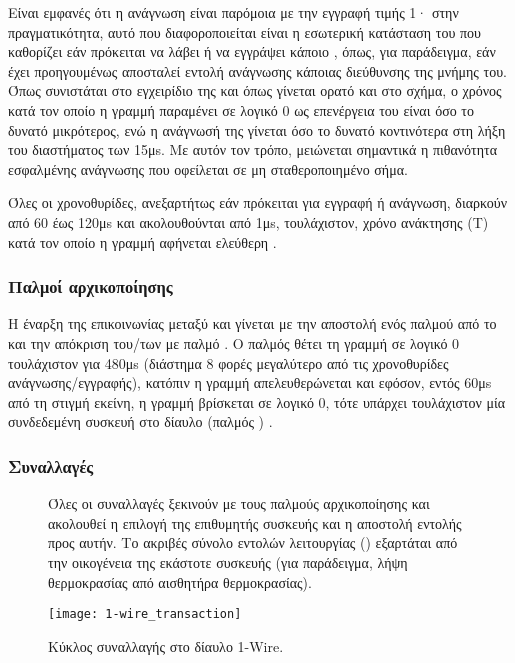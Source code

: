 Είναι εμφανές ότι η ανάγνωση είναι παρόμοια με την εγγραφή  τιμής 1·
στην πραγματικότητα, αυτό που διαφοροποιείται είναι η εσωτερική κατάσταση του
 που καθορίζει εάν πρόκειται να λάβει ή να εγγράψει κάποιο ,
όπως, για παράδειγμα, εάν έχει προηγουμένως αποσταλεί εντολή ανάγνωσης κάποιας
διεύθυνσης της μνήμης του.
Όπως συνιστάται στο εγχειρίδιο της \textcite[17]{ds18b20} και όπως γίνεται ορατό
και στο σχήμα, ο χρόνος κατά τον οποίο η γραμμή παραμένει σε λογικό 0 ως
επενέργεια του  είναι όσο το δυνατό μικρότερος, ενώ η ανάγνωσή της
γίνεται όσο το δυνατό κοντινότερα στη λήξη του διαστήματος των 15μs. Με αυτόν
τον τρόπο, μειώνεται σημαντικά η πιθανότητα εσφαλμένης ανάγνωσης που οφείλεται
σε μη σταθεροποιημένο σήμα.

Όλες οι χρονοθυρίδες, ανεξαρτήτως εάν πρόκειται για εγγραφή ή ανάγνωση, διαρκούν
από 60 έως 120μs και ακολουθούνται από 1μs, τουλάχιστον, χρόνο ανάκτησης
(T) κατά τον οποίο η γραμμή αφήνεται ελεύθερη
\parencites[15--16]{ds18b20}[2]{atmel04}.


\subsubsection{Παλμοί αρχικοποίησης}

Η έναρξη της επικοινωνίας μεταξύ  και  γίνεται με την
αποστολή ενός παλμού  από το  και την απόκριση
του\slash{}των  με παλμό  \parencite[15]{ds18b20}. Ο
παλμός  θέτει τη γραμμή σε λογικό 0 τουλάχιστον για 480μs (διάστημα 8
φορές μεγαλύτερο από τις χρονοθυρίδες ανάγνωσης\slash{}εγγραφής), κατόπιν η
γραμμή απελευθερώνεται και εφόσον, εντός 60μs από τη στιγμή εκείνη, η γραμμή
βρίσκεται σε λογικό 0, τότε υπάρχει τουλάχιστον μία συνδεδεμένη 
συσκευή στο δίαυλο (παλμός ) \parencite[3]{atmel04}.


\subsubsection{Συναλλαγές}

\begin{figure}
    \caption{Κύκλος συναλλαγής στο δίαυλο 1-Wire.
    \label{fig:1-wire:transaction}}
    Όλες οι συναλλαγές ξεκινούν με τους παλμούς αρχικοποίησης και ακολουθεί η
    επιλογή της επιθυμητής  συσκευής και η αποστολή εντολής προς
    αυτήν. Το ακριβές σύνολο εντολών λειτουργίας ()
    εξαρτάται από την οικογένεια της εκάστοτε συσκευής (για παράδειγμα, λήψη
    θερμοκρασίας από αισθητήρα θερμοκρασίας).
    \begin{center}
    \texttt{[image: 1-wire\_transaction]}
    \end{center}
\end{figure}

